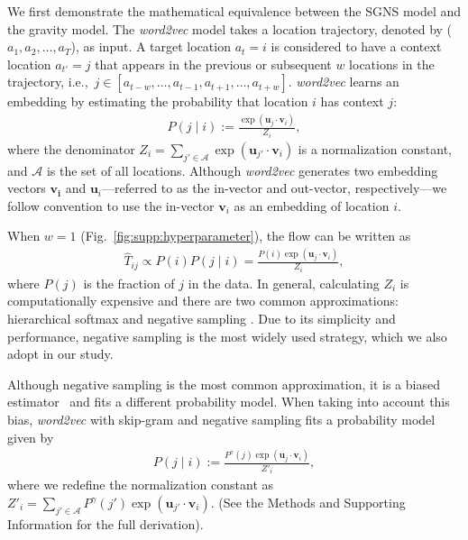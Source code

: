 \documentclass[12pt]{article} %
\def\given{\mid}
\def\ie{i.e.,~}
\begin{document}
We first demonstrate the mathematical equivalence between the SGNS model and the gravity model.
The {\it word2vec} model takes a location trajectory, denoted by ($a_{1}, a_{2}, \ldots, a_{T}$), as input.
A target location $a_t=i$ is considered to have a context location $a_{t'}=j$ that appears in the previous or subsequent $w$ locations in the trajectory, \ie  $j \in [a_{t-w}, \ldots, a_{t-1}, a_{t+1},\ldots, a_{t+w}]$.
	{\it word2vec} learns an embedding by estimating the probability that location $i$ has context $j$:
\begin{align}
	P\left(j \given i \right):= \frac{\exp(\bm{u}_j \cdot \bm{v}_{i})}{Z_i}, \label{eq:prob_w2v_ng}
\end{align}
where the denominator $Z_i=\sum_{j' \in \mathcal{A}} \exp(\bm{u}_{j'} \cdot \bm{v}_{i})$ is a normalization constant, and $\mathcal{A}$ is the set of all locations.
Although {\it word2vec} generates two embedding vectors $\bm{v_i}$ and $\bm{u}_i$---referred to as the in-vector and out-vector, respectively---we follow convention to use the in-vector $\bm{v}_i$ as an embedding of location $i$.

When $w=1$ (Fig.~\ref{fig:supp:hyperparameter}), the flow can be written as
\begin{align}
	\label{eq:flow_w2v}
	\hat{T}_{ij} \propto P(i) P(j\given i) = \frac{P(i)\exp(\bm{u}_j \cdot \bm{v}_{i})}{Z_i},
\end{align}
where $P(j)$ is the fraction of $j$ in the data.
In general, calculating $Z_i$ is computationally expensive and there are two common approximations: hierarchical softmax \autocite{morin2005hierarchical} and negative sampling \autocite{mikolov2013word2vec}.
Due to its simplicity and performance, negative sampling is the most widely used strategy, which we also adopt in our study.

Although negative sampling is the most common approximation, it is a biased estimator~\autocite{Chia2010,Dyer2014} and fits a different probability model. When taking into account this bias, {\it word2vec} with skip-gram and negative sampling fits a probability model given by
\begin{align}
	P\left(j \given i \right):= \frac{P^ \gamma(j) \exp(\bm{u}_j \cdot \bm{v}_{i})}{Z'_i}, \label{eq:prob_w2v_ng0}
\end{align}
where we redefine the normalization constant as $Z'_i=\sum_{j' \in \mathcal{A}} P^ \gamma (j') \exp(\bm{u}_{j'} \cdot \bm{v}_{i})$. (See the Methods and Supporting Information for the full derivation).
\end{document}
